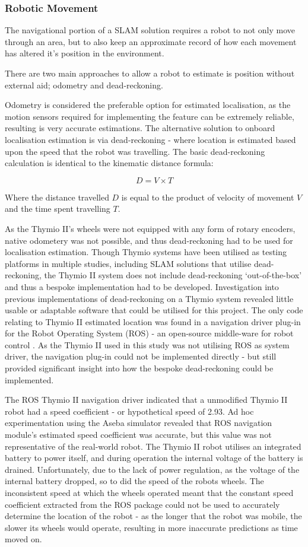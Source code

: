 \subsubsection{Robotic Movement}
The navigational portion of a SLAM solution requires a robot to not only move
through an area, but to also keep an approximate record of how each movement
has altered it's position in the environment.

There are two main approaches to allow a robot to estimate is position
without external aid; odometry and dead-reckoning.

Odometry is considered the preferable option for estimated localisation, as
the motion sensors required for implementing the feature can be extremely
reliable, resulting is very accurate estimations.
The alternative solution to onboard localisation estimation is via
dead-reckoning - where location is estimated based upon the speed that the
robot was travelling.
The basic dead-reckoning calculation is identical to the kinematic
distance formula:

\[ D = V \times T \]

Where the distance travelled \(D\) is equal to the product of velocity of
movement \(V\) and the time spent travelling \(T\).

As the Thymio II's wheels were not equipped with any form of rotary encoders,
native odometery was not possible, and thus dead-reckoning had to be used for
localisation estimation.
Though Thymio systems have been utilised as testing platforms in multiple
studies, including SLAM solutions that utilise dead-reckoning, the Thymio II
system does not include dead-reckoning `out-of-the-box' and thus a bespoke
implementation had to be developed.
Investigation into previous implementations of dead-reckoning on a Thymio
system revealed little usable or adaptable software that could be utilised for
this project.
The only code relating to Thymio II estimated location was found in a
navigation driver plug-in for the Robot Operating System (ROS) - an open-source
middle-ware for robot control \cite{steph}.
As the Thymio II used in this study was not utilising ROS as system driver,
the navigation plug-in could not be implemented directly - but still provided
significant insight into how the bespoke dead-reckoning could be implemented.

The ROS Thymio II navigation driver indicated that a unmodified Thymio II
robot had a speed coefficient - or hypothetical speed of 2.93.
Ad hoc experimentation using the Aseba simulator revealed that ROS navigation
module's estimated speed coefficient was accurate, but this value was not
representative of the real-world robot.
The Thymio II robot utilises an integrated battery to power itself, and
during operation the internal voltage of the battery is drained.
Unfortunately, due to the lack of power regulation, as the voltage of the
internal battery dropped, so to did the speed of the robots wheels.
The inconsistent speed at which the wheels operated meant that the
constant speed coefficient extracted from the ROS package could not be used to
accurately determine the location of the robot - as the longer that the robot
was mobile, the slower its wheels would operate, resulting in more inaccurate
predictions as time moved on.

